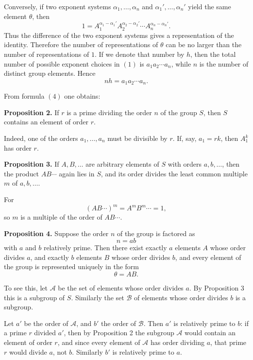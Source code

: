 \documentclass[11pt]{article}
\begin{document}
Conversely, if two exponent systems \(\alpha_1,\dots,\alpha_n\) and \(\alpha_1',\dots,\alpha_n'\) yield the same element \(\theta\), then
\[
1=A_1^{\alpha_1-\alpha_1'}A_2^{\alpha_2-\alpha_2'}\cdots A_n^{\alpha_n-\alpha_n'}.
\tag{3}
\]
Thus the difference of the two exponent systems gives a representation of the identity. Therefore the number of representations of \(\theta\) can be no larger than the number of representations of \(1\). If we denote that number by \(h\), then the total number of possible exponent choices in \((1)\) is \(a_1a_2\cdots a_n\), while \(n\) is the number of distinct group elements. Hence
\[
nh=a_1a_2\cdots a_n.
\tag{4}
\]

From formula \((4)\) one obtains:

\medskip
\noindent\textbf{Proposition 2.}
If \(r\) is a prime dividing the order \(n\) of the group \(S\), then \(S\) contains an element of order \(r\).

\medskip
Indeed, one of the orders \(a_1,\dots,a_n\) must be divisible by \(r\). If, say, \(a_1=rk\), then \(A_1^k\) has order \(r\).

\medskip
\noindent\textbf{Proposition 3.}
If \(A,B,\dots\) are arbitrary elements of \(S\) with orders \(a,b,\dots\), then the product \(AB\cdots\) again lies in \(S\), and its order divides the least common multiple \(m\) of \(a,b,\dots\).

\medskip
For
\[
(AB\cdots)^m=A^mB^m\cdots=1,
\]
so \(m\) is a multiple of the order of \(AB\cdots\).

\medskip
\noindent\textbf{Proposition 4.}
Suppose the order \(n\) of the group is factored as
\[
n=ab
\]
with \(a\) and \(b\) relatively prime. Then there exist exactly \(a\) elements \(A\) whose order divides \(a\), and exactly \(b\) elements \(B\) whose order divides \(b\), and every element of the group is represented uniquely in the form
\[
\theta=AB.
\tag{5}
\]

To see this, let \(\mathcal A\) be the set of elements whose order divides \(a\). By Proposition 3 this is a subgroup of \(S\). Similarly the set \(\mathcal B\) of elements whose order divides \(b\) is a subgroup.

Let \(a'\) be the order of \(\mathcal A\), and \(b'\) the order of \(\mathcal B\). Then \(a'\) is relatively prime to \(b\): if a prime \(r\) divided \(a'\), then by Proposition 2 the subgroup \(\mathcal A\) would contain an element of order \(r\), and since every element of \(\mathcal A\) has order dividing \(a\), that prime \(r\) would divide \(a\), not \(b\). Similarly \(b'\) is relatively prime to \(a\).
\end{document}
